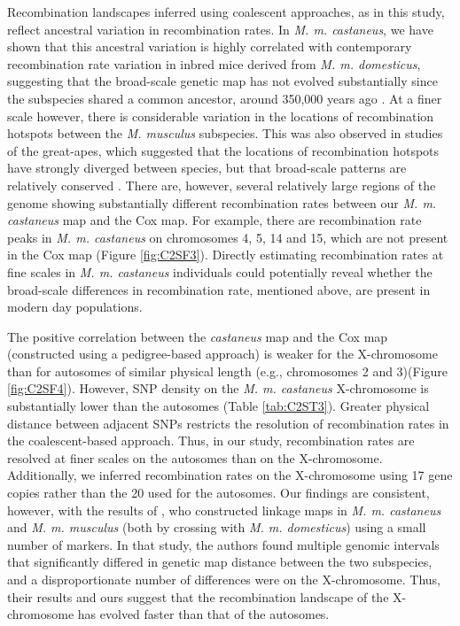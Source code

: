 	Recombination landscapes inferred using coalescent approaches, as in this study, reflect ancestral variation in recombination rates. In \textit{M. m. castaneus}, we have shown that this ancestral variation is highly correlated with contemporary recombination rate variation in inbred mice derived from \textit{M. m. domesticus}, suggesting that the broad-scale genetic map has not evolved substantially since the subspecies shared a common ancestor, around 350,000 years ago \citep{RN315}. At a finer scale however, there is considerable variation in the locations of recombination hotspots between the \textit{M. musculus} subspecies. This was also observed in studies of the great-apes, which suggested that the locations of recombination hotspots have strongly diverged between species, but that broad-scale patterns are relatively conserved \citep{RN222, RN221}. There are, however, several relatively large regions of the genome showing substantially different recombination rates between our \textit{M. m. castaneus} map and the Cox map. For example, there are recombination rate peaks in \textit{M. m. castaneus} on chromosomes 4, 5, 14 and 15, which are not present in the Cox map (Figure \ref{fig:C2SF3}). Directly estimating recombination rates at fine scales in \textit{M. m. castaneus} individuals could potentially reveal whether the broad-scale differences in recombination rate, mentioned above, are present in modern day populations. 

The positive correlation between the \textit{castaneus} map and the Cox map (constructed using a pedigree-based approach) is weaker for the X-chromosome than for autosomes of similar physical length (e.g., chromosomes 2 and 3)(Figure \ref{fig:C2SF4}). However, SNP density on the \textit{M. m. castaneus} X-chromosome is substantially lower than the autosomes (Table \ref{tab:C2ST3}). Greater physical distance between adjacent SNPs restricts the resolution of recombination rates in the coalescent-based approach. Thus, in our study, recombination rates are resolved at finer scales on the autosomes than on the X-chromosome. Additionally, we inferred recombination rates on the X-chromosome using 17 gene copies rather than the 20 used for the autosomes. Our findings are consistent, however, with the results of \cite{RN244}, who constructed linkage maps in \textit{M. m. castaneus} and \textit{M. m. musculus} (both by crossing with \textit{M. m. domesticus}) using a small number of markers. In that study, the authors found multiple genomic intervals that significantly differed in genetic map distance between the two subspecies, and a disproportionate number of differences were on the X-chromosome. Thus, their results and ours suggest that the recombination landscape of the X-chromosome has evolved faster than that of the autosomes. 

